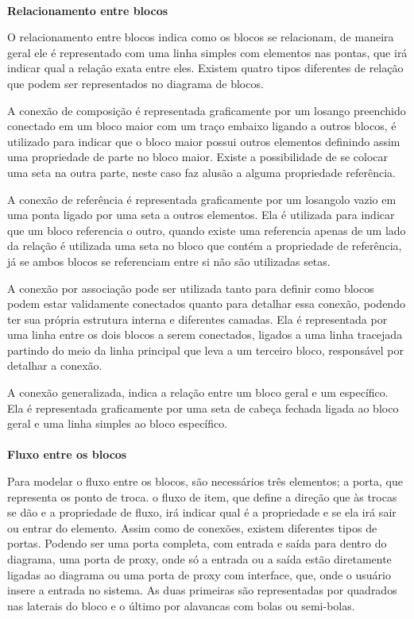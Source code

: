 \paragraph{}
 \textbf{Relacionamento entre blocos} 
 
O relacionamento entre blocos indica como os blocos se relacionam, de maneira geral ele é representado com uma linha simples com elementos nas pontas, que irá indicar qual a relação exata entre eles. Existem quatro tipos diferentes de relação que podem ser representados no diagrama de blocos. 

A conexão de composição é representada graficamente por um losango preenchido conectado em um bloco maior com um traço embaixo ligando a outros blocos, é utilizado para indicar que o bloco maior possui outros elementos definindo assim uma propriedade de parte no bloco maior. Existe a possibilidade de se colocar uma seta na outra parte, neste caso faz alusão a alguma propriedade referência. 

A conexão de referência é representada graficamente por um losangolo vazio em uma ponta ligado por uma seta a outros elementos. Ela é utilizada para indicar que um bloco referencia o outro, quando existe uma referencia apenas de um lado da relação é utilizada uma seta no bloco que contém a propriedade de referência, já se ambos blocos se referenciam entre si não são utilizadas setas.

A conexão por associação pode ser utilizada tanto para definir como blocos podem estar validamente conectados quanto para detalhar essa conexão, podendo ter sua própria estrutura interna e diferentes camadas. Ela é representada por uma linha entre os dois blocos a serem conectados, ligados a uma linha tracejada partindo do meio da linha principal que leva a um terceiro bloco, responsável por detalhar a conexão. 

A conexão generalizada, indica a relação entre um bloco geral e um específico. Ela é representada graficamente por uma seta de cabeça fechada ligada ao bloco geral e uma linha simples ao bloco específico.

\paragraph{}
 \textbf{Fluxo entre os blocos} 
 
Para modelar o fluxo entre os blocos, são necessários três elementos; a porta, que representa os ponto de troca. o  fluxo de item, que define a direção que às trocas se dão e a propriedade de fluxo, irá indicar qual é a propriedade e se ela irá sair ou entrar do elemento. Assim como de conexões, existem diferentes tipos de portas. Podendo ser uma porta completa, com entrada e saída para dentro do diagrama, uma porta de proxy, onde só a entrada ou a saída estão diretamente ligadas ao diagrama ou uma porta de proxy com interface, que, onde o usuário insere a entrada no sistema. As duas primeiras são representadas por quadrados nas laterais do bloco e o último por alavancas com bolas ou semi-bolas.

